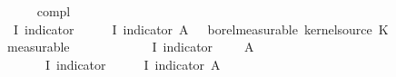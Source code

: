 \begin{isabellebody}
\ \ \ \ \isamarkupfalse%
\ compl\ \isamarkupfalse%
\ {\isachardoublequoteopen}{\isacharparenleft}{\kern0pt}{\isasymlambda}{\isasymomega}\ I\ {\isacharparenleft}{\kern0pt}indicator\ {\isacharparenleft}{\kern0pt}{\isacharquery}{\kern0pt}{\isasymOmega}\ {\isasymtimes}\ {\isacharquery}{\kern0pt}{\isasymOmega}\ {\isasymomega}\ {\isacharminus}{\kern0pt}\ I\ {\isacharparenleft}{\kern0pt}indicator\ A{\isacharparenright}{\kern0pt}\ {\isasymomega}\ {\isasymin}\ borel{\isacharunderscore}{\kern0pt}measurable\ {\isacharparenleft}{\kern0pt}kernel{\isacharunderscore}{\kern0pt}source\ K{\isacharparenright}{\kern0pt}{\isachardoublequoteclose}\isanewline
\ \ \ \ \ \ \isamarkupfalse%
\ measurable\isanewline
\ \ \ \ \isamarkupfalse%
\ \isamarkupfalse%
\ {\isachardoublequoteopen}{\isasymAnd}{\isasymomega}\ {\isasymomega}\ {\isasymin}\ {\isacharquery}{\kern0pt}{\isasymOmega}\ {\isasymLongrightarrow}\ I\ {\isacharparenleft}{\kern0pt}indicator\ {\isacharparenleft}{\kern0pt}{\isacharparenleft}{\kern0pt}{\isacharquery}{\kern0pt}{\isasymOmega}\ {\isasymtimes}\ {\isacharquery}{\kern0pt}{\isasymOmega}\ {\isacharminus}{\kern0pt}\ A{\isacharparenright}{\kern0pt}{\isacharparenright}{\kern0pt}\ {\isasymomega}\ {\isacharequal}{\kern0pt}\isanewline
\ \ \ \ \ \ \ I\ {\isacharparenleft}{\kern0pt}indicator\ {\isacharparenleft}{\kern0pt}{\isacharquery}{\kern0pt}{\isasymOmega}\ {\isasymtimes}\ {\isacharquery}{\kern0pt}{\isasymOmega}\ {\isasymomega}\ {\isacharminus}{\kern0pt}\ I\ {\isacharparenleft}{\kern0pt}indicator\ A{\isacharparenright}{\kern0pt}\ {\isasymomega}\isanewline
\ \ \ \ \isamarkupfalse%
\ {\isacharminus}{\kern0pt}\isanewline
\ \ \ \ \ \ \isamarkupfalse%
\ {\isasymomega}\ \isamarkupfalse%
\ {\isasymomega}\ {\isachardoublequoteopen}{\isasymomega}\ {\isasymin}\ {\isacharquery}{\kern0pt}{\isasymOmega}\isanewline

\end{isabellebody}
